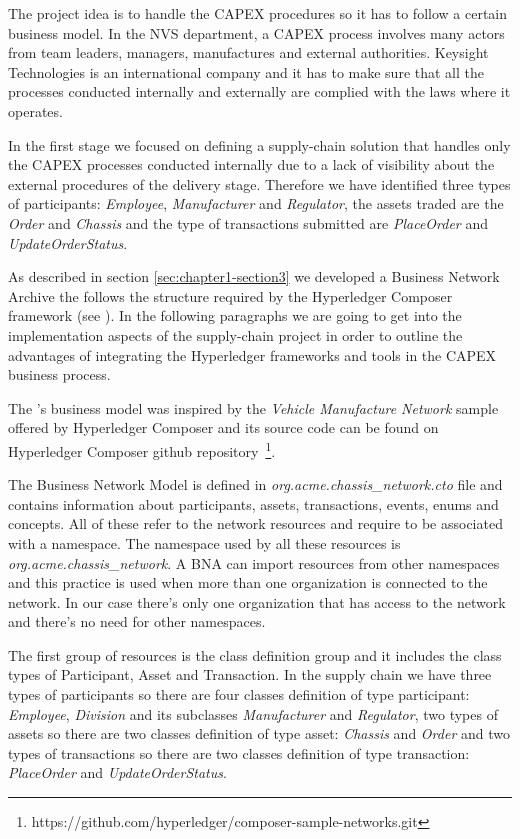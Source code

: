 The project idea is to handle the CAPEX procedures so it has to follow a certain business model. In the NVS department, a CAPEX process involves many actors from team leaders, managers, manufactures and external authorities. 
Keysight Technologies is an international company and it has to make sure that all the processes conducted internally and externally are complied with the laws where it operates.

In the first stage we focused on defining a supply-chain solution that handles only the CAPEX processes conducted internally due to a lack of visibility about the external procedures of the delivery stage. 
Therefore we have identified three types of participants: \emph{Employee}, \emph{Manufacturer} and \emph{Regulator}, the assets traded are the \emph{Order} and \emph{Chassis} and the type of transactions submitted are \emph{PlaceOrder} and \emph{UpdateOrderStatus}.

As described in section \ref{sec:chapter1-section3} we developed a Business Network Archive the follows the structure required by the Hyperledger Composer framework (see ). In the following paragraphs we are going to get into the implementation aspects of the supply-chain project in order to outline the advantages of integrating the Hyperledger frameworks and tools in the CAPEX business process. 

The {\project}'s business model was inspired by the \emph{Vehicle Manufacture Network} sample offered by Hyperledger Composer and its source code can be found on Hyperledger Composer github repository~\footnote{ https://github.com/hyperledger/composer-sample-networks.git}.


The Business Network Model is defined in \emph{org.acme.chassis_network.cto} file and contains information about participants, assets, transactions, events, enums and concepts. All of these refer to the network resources and require to be associated with a namespace. The namespace used by all these resources is \emph{org.acme.chassis_network}. A BNA can import resources from other namespaces and this practice is used when more than one organization is connected to the network. In our case there's only one organization that has access to the network and there's no need for other namespaces.

The first group of resources is the class definition group and it includes the class types of Participant, Asset and Transaction. In the supply chain we have three types of participants so there are four classes definition of type participant: \emph{Employee}, \emph{Division} and its subclasses \emph{Manufacturer} and \emph{Regulator}, two types of assets so there are two classes definition of type asset: \emph{Chassis} and \emph{Order} and two types of transactions so there are two classes definition of type transaction: \emph{PlaceOrder} and \emph{UpdateOrderStatus}. 


